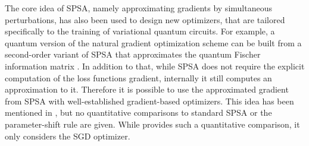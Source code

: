 The core idea of \gls{SPSA}, namely approximating gradients by simultaneous perturbations, has also been used to design new optimizers, that are tailored specifically to the training of variational quantum circuits.
For example, a quantum version of the natural gradient optimization scheme can be built from a second-order variant of \gls{SPSA} that approximates the quantum Fischer information matrix \cite{Gacon2021, Gidi2022}.
In addition to that, while SPSA does not require the explicit computation of the loss functions gradient, internally it still computes an approximation to it. Therefore it is possible to use the approximated gradient from \gls{SPSA} with well-established gradient-based optimizers. This idea has been mentioned in \cite{Ebadi2022}, but no quantitative comparisons to standard SPSA or the parameter-shift rule are given. While \cite{Hoffmann2022} provides such a quantitative comparison, it only considers the \gls{SGD} optimizer.
